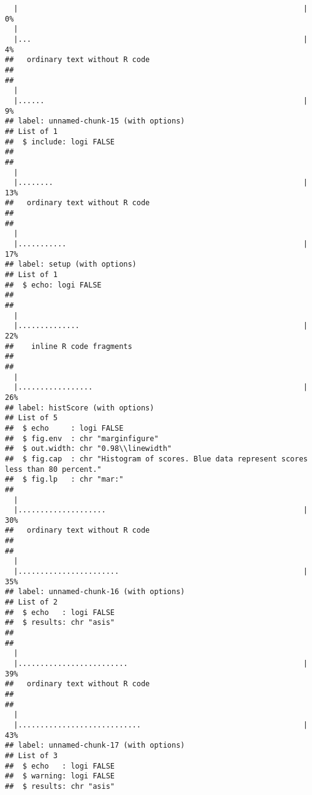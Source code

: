 \documentclass{article}\usepackage[]{graphicx}\usepackage[]{color}
\makeatletter
\newenvironment{kframe}{%
 \def\at@end@of@kframe{}%
 \ifinner\ifhmode%
  \def\at@end@of@kframe{\end{minipage}}%
  \begin{minipage}{\columnwidth}%
 \fi\fi%
 \def\FrameCommand##1{\hskip\@totalleftmargin \hskip-\fboxsep
 \colorbox{shadecolor}{##1}\hskip-\fboxsep
     \hskip-\linewidth \hskip-\@totalleftmargin \hskip\columnwidth}%
 \MakeFramed {\advance\hsize-\width
   \@totalleftmargin\z@ \linewidth\hsize
   \@setminipage}}%
 {\par\unskip\endMakeFramed%
 \at@end@of@kframe}
\newenvironment{knitrout}{}{} %
\numberwithin{equation}{section} %
\makeatother
\begin{document}
\begin{knitrout}
\begin{kframe}
\begin{verbatim}
  |                                                                 |   0%
  |                                                                       
  |...                                                              |   4%
##   ordinary text without R code
## 
## 
  |                                                                       
  |......                                                           |   9%
## label: unnamed-chunk-15 (with options) 
## List of 1
##  $ include: logi FALSE
## 
## 
  |                                                                       
  |........                                                         |  13%
##   ordinary text without R code
## 
## 
  |                                                                       
  |...........                                                      |  17%
## label: setup (with options) 
## List of 1
##  $ echo: logi FALSE
## 
## 
  |                                                                       
  |..............                                                   |  22%
##    inline R code fragments
## 
## 
  |                                                                       
  |.................                                                |  26%
## label: histScore (with options) 
## List of 5
##  $ echo     : logi FALSE
##  $ fig.env  : chr "marginfigure"
##  $ out.width: chr "0.98\\linewidth"
##  $ fig.cap  : chr "Histogram of scores. Blue data represent scores less than 80 percent."
##  $ fig.lp   : chr "mar:"
## 
  |                                                                       
  |....................                                             |  30%
##   ordinary text without R code
## 
## 
  |                                                                       
  |.......................                                          |  35%
## label: unnamed-chunk-16 (with options) 
## List of 2
##  $ echo   : logi FALSE
##  $ results: chr "asis"
## 
## 
  |                                                                       
  |.........................                                        |  39%
##   ordinary text without R code
## 
## 
  |                                                                       
  |............................                                     |  43%
## label: unnamed-chunk-17 (with options) 
## List of 3
##  $ echo   : logi FALSE
##  $ warning: logi FALSE
##  $ results: chr "asis"
\end{verbatim}



\end{kframe}
\end{knitrout}
\end{document}
